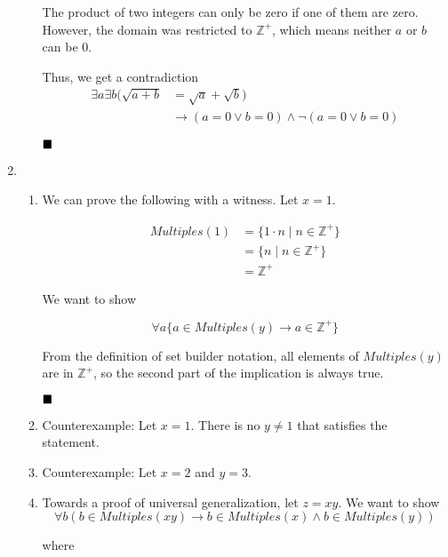 \documentclass{article}
\newcommand{\Z}{\mathbb{Z}}
\newcommand{\mult}{\textit{Multiples}}
\newcommand{\qed}{\hfill\blacksquare}
\begin{document}
\begin{enumerate}
\begin{enumerate}
		            The product of two integers can only be zero if one of them are zero.
		            However, the domain was restricted to $\Z^+$, which means neither $a$ or $b$
		            can be 0.

		            Thus, we get a contradiction
		            \begin{align*}
			            \exists a \exists b ( \sqrt{a + b} & = \sqrt a + \sqrt b)   \\
			                                               & \to (a = 0 \lor b = 0)
			            \land \lnot (a = 0 \lor b = 0)
		            \end{align*}

		            $\qed$

	      \end{enumerate}

	\item \begin{enumerate}
		      \item We can prove the following with a witness. Let $x = 1$.

		            \begin{align*}
			            \mult(1) & = \{1 \cdot n \mid n \in \Z^+\} \\
			                     & = \{n \mid n \in \Z^+\}         \\
			                     & = \Z^+
		            \end{align*}

		            We want to show

		            $$
			            \forall a \{ a \in \mult(y) \to a \in \Z^+ \}
		            $$

		            From the definition of set builder notation, all elements of $\mult(y)$
		            are in $\Z^+$, so the second part of the implication is always true.

		            $\qed$

		      \item Counterexample: Let $x=1$. There is no $y \ne 1$ that satisfies the statement.

		      \item Counterexample: Let $x=2$ and $y=3$.
		      \item Towards a proof of universal generalization, let $z = xy$. We want to show
		            $$
			            \forall b ( b \in \mult(xy) \to b \in \mult(x) \land b \in \mult(y))
		            $$

		            where


\end{enumerate}
\end{enumerate}
\end{document}
